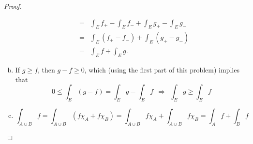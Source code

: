 \begin{pblm}
\begin{proof}
\begin{enumerate}[(a)]
\begin{equation*}
\begin{array}{rcl}
			& = & \int_Ef_+-\int_Ef_-+\int_Eg_+-\int_Eg_- \\ 	
			& = & \int_E(f_+-f_-) + \int_E(g_+-g_-) \\
			& = & \int_Ef + \int_Eg. 
	\end{array}
	\end{equation*}
	\item If $g \ge f$, then $g - f \ge 0$, which (using the first part of this problem) implies that 
		\begin{equation*}
			0 \le \int_E(g - f) = \int_Eg - \int_E f ~~\Rightarrow~~ \int_Eg \ge \int_Ef 
		\end{equation*}
	\item 
	\begin{equation*}
		\int_{A\cup B} f = \int_{A\cup B} \left(f \chi_A + f\chi_B\right) = 
		\int_{A\cup B} f\chi_A + \int_{A\cup B} f\chi_B = \int_A f + \int_B f
	\end{equation*}
	\end{enumerate}
\end{proof}
\end{pblm}

